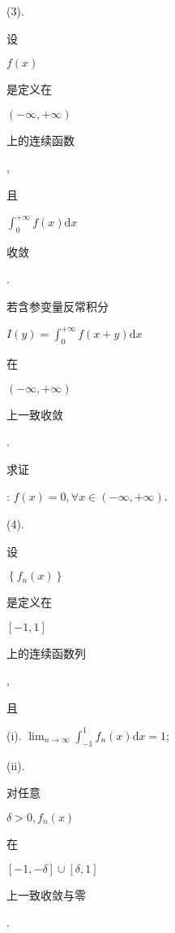 \documentclass[10pt]{article}
\begin{document}
(3). \begin{CJK}{UTF8}{mj}设\end{CJK} $f(x)$ \begin{CJK}{UTF8}{mj}是定义在\end{CJK} $(-\infty,+\infty)$ \begin{CJK}{UTF8}{mj}上的连续函数\end{CJK}, \begin{CJK}{UTF8}{mj}且\end{CJK} $\int_{0}^{+\infty} f(x) \mathrm{d} x$ \begin{CJK}{UTF8}{mj}收敛\end{CJK}. \begin{CJK}{UTF8}{mj}若含参变量反常积分\end{CJK} $I(y)=\int_{0}^{+\infty} f(x+y) \mathrm{d} x$ \begin{CJK}{UTF8}{mj}在\end{CJK} $(-\infty,+\infty)$ \begin{CJK}{UTF8}{mj}上一致收敛\end{CJK}. \begin{CJK}{UTF8}{mj}求证\end{CJK}: $f(x)=0, \forall x \in(-\infty,+\infty)$.

(4). \begin{CJK}{UTF8}{mj}设\end{CJK} $\left\{f_{n}(x)\right\}$ \begin{CJK}{UTF8}{mj}是定义在\end{CJK} $[-1,1]$ \begin{CJK}{UTF8}{mj}上的连续函数列\end{CJK}, \begin{CJK}{UTF8}{mj}且\end{CJK}

(i). $\lim _{n \rightarrow \infty} \int_{-1}^{1} f_{n}(x) \mathrm{d} x=1$;

(ii). \begin{CJK}{UTF8}{mj}对任意\end{CJK} $\delta>0, f_{n}(x)$ \begin{CJK}{UTF8}{mj}在\end{CJK} $[-1,-\delta] \cup[\delta, 1]$ \begin{CJK}{UTF8}{mj}上一致收敛与零\end{CJK}.
\end{document}
